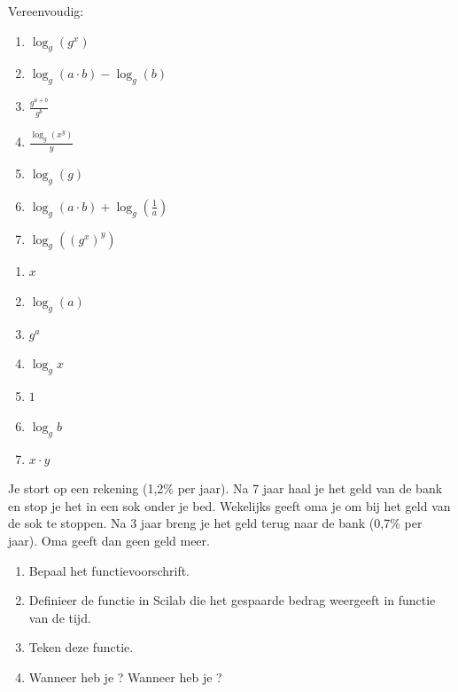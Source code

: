 \begin{oef}
Vereenvoudig:
\begin{enumerate}
  \item $\log_g(g^x)$
  \item $\log_g(a \cdot b) - \log_g(b)$
  \item $\displaystyle \frac{g^{a+b}}{g^b}$
  \item $\displaystyle \frac{\log_g(x^y)}{y}$
  \item $\log_g(g)$
  \item $\displaystyle \log_g(a \cdot b) + \log_g(\frac1a)$
  \item $\log_g((g^x)^y)$
\end{enumerate}
\begin{opl}
\begin{enumerate}
  \item $x$
  \item $\log_g(a)$
  \item $g^a$
  \item $\log_g x$
  \item $1$
  \item $\log_g b$
  \item $x \cdot y$
\end{enumerate}
\end{opl}
\end{oef}

\begin{oef}
Je stort  op een rekening (1,2\% per jaar).
Na 7 jaar haal je het geld van de bank en stop je het in een sok onder je bed.
Wekelijks geeft oma je  om bij het geld van de sok te stoppen.
Na 3 jaar breng je het geld terug naar de bank (0,7\% per jaar).
Oma geeft dan geen geld meer.
\begin{enumerate}
  \item Bepaal het functievoorschrift.
  \item Definieer de functie in Scilab die het gespaarde bedrag weergeeft in functie van de tijd. 
  \item Teken deze functie.
  \item Wanneer heb je ? Wanneer heb je ? 
\end{enumerate}
\end{oef}


